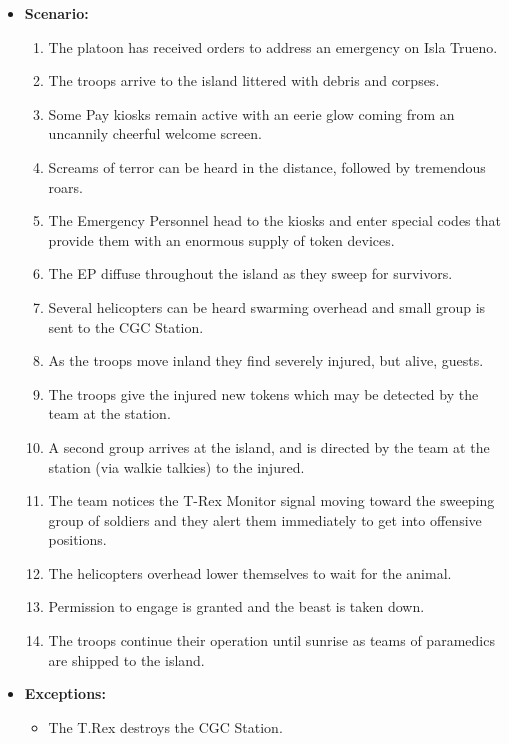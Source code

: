 \documentclass[12pt]{article}
\begin{document}
\begin{itemize}
        \item[]\textbf{Scenario:}
            \begin{enumerate}
                \item The platoon has received orders to address an emergency on Isla Trueno. 
                \item The troops arrive to the island littered with debris and corpses. 
                \item Some Pay kiosks remain active with an eerie glow coming from an uncannily 
                cheerful welcome screen.
                \item Screams of terror can be heard in the distance, followed by tremendous roars.
                \item The Emergency Personnel head to the kiosks and enter special codes that provide
                them with an enormous supply of token devices.
                \item The EP diffuse throughout the island as they sweep for survivors.
                \item Several helicopters can be heard swarming overhead and small group
                is sent to the CGC Station.
                \item As the troops move inland they find severely injured, but alive, guests.
                \item The troops give the injured new tokens which may be detected by the team
                at the station.
                \item A second group arrives at the island, and is directed by the team at the station
                (via walkie talkies) to the injured.
                \item The team notices the T-Rex Monitor signal moving toward the sweeping group of soldiers
                and they alert them immediately to get into offensive positions.
                \item The helicopters overhead lower themselves to wait for the animal.
                \item Permission to engage is granted and the beast is taken down.
                \item The troops continue their operation until sunrise as teams of paramedics
                are shipped to the island.
            \end{enumerate}

        \item[]\textbf{Exceptions:}
            \begin{itemize}
                \item[] The T.Rex destroys the CGC Station.
            \end{itemize}


\end{itemize}
\end{document}
